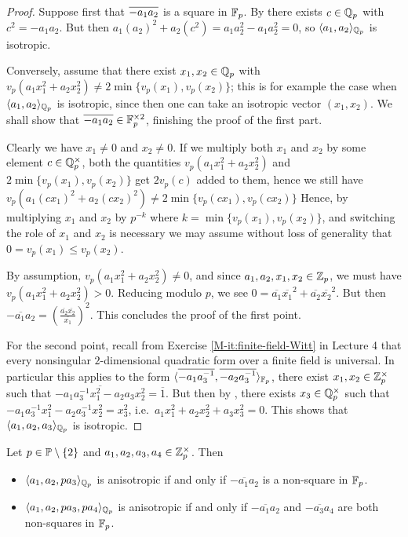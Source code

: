 \documentclass[12pt, leqno, british]{amsart}
\begin{document}
\begin{proof}
Suppose first that $\overline{-a_1a_2}$ is a square in $\mathbb F_p$. By  there exists $c \in \mathbb Q_p$ with $c^2 = -a_1a_2$.
But then $a_1(a_2)^2 + a_2(c^2) = a_1a_2^2 - a_1a_2^2 = 0$, so $\langle a_1, a_2 \rangle_{\mathbb Q_p}$ is isotropic.

Conversely, assume that there exist $x_1, x_2 \in \mathbb Q_p$ with $v_p(a_1x_1^2 + a_2x_2^2) \neq 2\min \lbrace v_p(x_1), v_p(x_2) \rbrace$; this is for example the case when $\langle a_1, a_2 \rangle_{\mathbb Q_p}$ is isotropic, since then one can take an isotropic vector $(x_1, x_2)$.
We shall show that $\overline{-a_1a_2} \in \mathbb F_p^{\times 2}$, finishing the proof of the first part.

Clearly we have $x_1 \neq 0$ and $x_2 \neq 0$.
If we multiply both $x_1$ and $x_2$ by some element $c \in \mathbb Q_p^\times$, both the quantities $v_p(a_1x_1^2 + a_2x_2^2)$ and $2\min \lbrace v_p(x_1), v_p(x_2) \rbrace$ get $2v_p(c)$ added to them, hence we still have $v_p(a_1(cx_1)^2 + a_2(cx_2)^2) \neq 2\min \lbrace v_p(cx_1), v_p(cx_2) \rbrace$
Hence, by multiplying $x_1$ and $x_2$ by $p^{-k}$ where $k=\min \lbrace v_p(x_1), v_p(x_2) \rbrace$, and switching the role of $x_1$ and $x_2$ is necessary we may assume without loss of generality that $0 = v_p(x_1) \leq v_p(x_2)$.

By assumption, $v_p(a_1x_1^2 + a_2x_2^2) \neq 0$, and since $a_1, a_2, x_1, x_2 \in \mathbb Z_p$, we must have $v_p(a_1x_1^2 + a_2x_2^2) > 0$.
Reducing modulo $p$, we see $0 = \overline{a_1}\overline{x_1}^2 + \overline{a_2}\overline{x_2}^2$.
But then $\overline{-a_1a_2} = (\frac{\overline{a_2}\overline{x_2}}{\overline{x_1}})^2$.
This concludes the proof of the first point.

For the second point, recall from Exercise \eqref{M-it:finite-field-Witt} in Lecture 4 that every nonsingular $2$-dimensional quadratic form over a finite field is universal.
In particular this applies to the form $\langle \overline{-a_1a_3^{-1}}, \overline{-a_2a_3^{-1}}\rangle_{\mathbb F_p}$, there exist $x_1, x_2 \in \mathbb Z_p^\times$ such that $\overline{-a_1a_3^{-1}x_1^2 - a_2a_3x_2^2} = \overline{1}$.
But then by , there exists $x_3 \in \mathbb Q_p^\times$ such that $-a_1a_3^{-1}x_1^2 -a_2a_3^{-1}x_2^2 = x_3^2$, i.e.~$a_1x_1^2 + a_2x_2^2 + a_3x_3^2 = 0$.
This shows that $\langle a_1, a_2, a_3 \rangle_{\mathbb Q_p}$ is isotropic.
\end{proof}
\begin{lem}\label{L:qqp-odd-4d-form}
Let $p \in \mathbb P \setminus \lbrace 2 \rbrace$ and $a_1, a_2, a_3, a_4 \in \mathbb Z_p^\times$.
Then
\begin{itemize}
\item $\langle a_1, a_2, pa_3 \rangle_{\mathbb Q_p}$ is anisotropic if and only if $\overline{-a_1a_2}$ is a non-square in $\mathbb F_p$.
\item $\langle a_1, a_2, pa_3, pa_4 \rangle_{\mathbb Q_p}$ is anisotropic if and only if $\overline{-a_1a_2}$ and $\overline{-a_3a_4}$ are both non-squares in $\mathbb F_p$.
\end{itemize}
\end{lem}
\end{document}
